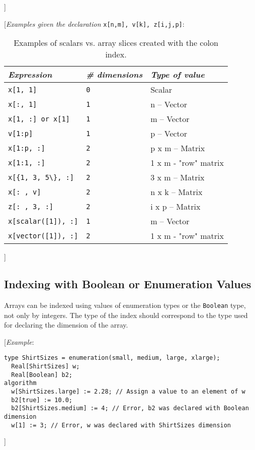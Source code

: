{]}

{[}\emph{Examples given the declaration} \lstinline!x[n,m], v[k], z[i,j,p]!:

\begin{longtable}[]{|l|l|l|}
\caption{Examples of scalars vs. array slices created with the colon index.}\\
\hline
\emph{Expression} & \emph{\# dimensions} & \emph{Type of value}\\ \hline
\endhead
\lstinline!x[1, 1]! & \lstinline!0! & Scalar\\ \hline
\lstinline!x[:, 1]! & \lstinline!1! & n -- Vector\\ \hline
\lstinline!x[1, :] or x[1]! & \lstinline!1! & m -- Vector\\ \hline
\lstinline!v[1:p]! & \lstinline!1! & p -- Vector\\ \hline
\lstinline!x[1:p, :]! & \lstinline!2! & p x m -- Matrix\\ \hline
\lstinline!x[1:1, :]! & \lstinline!2! & 1 x m - "row" matrix\\ \hline
\lstinline!x[{1, 3, 5\}, :]! & \lstinline!2! & 3 x m -- Matrix\\ \hline
\lstinline!x[: , v]! & \lstinline!2! & n x k -- Matrix\\ \hline
\lstinline!z[: , 3, :]! & \lstinline!2! & i x p -- Matrix\\ \hline
\lstinline!x[scalar([1]), :]! & \lstinline!1! & m -- Vector\\ \hline
\lstinline!x[vector([1]), :]! & \lstinline!2! & 1 x m - "row" matrix\\ \hline

\end{longtable}

{]}

\subsection{Indexing with Boolean or Enumeration Values}

Arrays can be indexed using values of enumeration types or the \lstinline!Boolean!
type, not only by integers. The type of the index should correspond to
the type used for declaring the dimension of the array.

{[}\emph{Example}:

\begin{lstlisting}[language=modelica]
  type ShirtSizes = enumeration(small, medium, large, xlarge);
  Real[ShirtSizes] w;
  Real[Boolean] b2;
algorithm
  w[ShirtSizes.large] := 2.28; // Assign a value to an element of w
  b2[true] := 10.0;
  b2[ShirtSizes.medium] := 4; // Error, b2 was declared with Boolean dimension
  w[1] := 3; // Error, w was declared with ShirtSizes dimension
\end{lstlisting}
{]}

